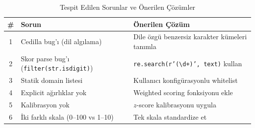 \begin{table}[H]
\centering
\caption{Tespit Edilen Sorunlar ve \"{O}nerilen \c{C}\"{o}z\"{u}mler}
\label{tab:issues-solutions}
\begin{tabularx}{\textwidth}{clX}
\toprule
\color{chapterBlue}\textbf{\#} & \color{chapterBlue}\textbf{Sorun} & \color{chapterBlue}\textbf{\"{O}nerilen \c{C}\"{o}z\"{u}m} \\
\midrule
1 & Cedilla bug'{\i} (dil alg{\i}lama) & Dile \"{o}zg\"{u} benzersiz karakter k\"{u}meleri tan{\i}mla \\
2 & Skor parse bug'{\i} (\texttt{filter(str.isdigit)}) & \texttt{re.search(r'(\textbackslash d+)', text)} kullan \\
3 & Statik domain listesi & Kullan{\i}c{\i} konfig\"{u}rasyonlu whitelist \\
4 & Explicit a\u{g}{\i}rl{\i}klar yok & Weighted scoring fonksiyonu ekle \\
5 & Kalibrasyon yok & $z$-score kalibrasyonu uygula \\
6 & \.{I}ki farkl{\i} skala (0--100 vs 1--10) & Tek skala standardize et \\
\bottomrule
\end{tabularx}
\end{table}



